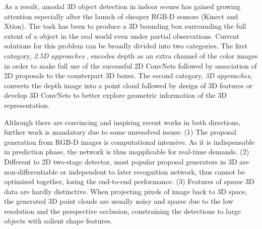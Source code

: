 \documentclass[10pt,twocolumn,letterpaper]{article}
\begin{document}
	As a result, amodal 3D object detection in indoor scenes has gained growing attention especially after the launch of cheaper RGB-D sensors (\eg Kinect and Xtion). The task has been to produce a 3D bounding box surrounding the full extent of a object in the real world even under partial observations. Current solutions for this problem can be broadly divided into two categories. The first category, \emph{2.5D approaches} \cite{K2013accurate, Wei2015DBM,Saurabh2015depthrcnn,Deng2017}, encodes depth as an extra channel of the color images in order to make full use of the successful 2D ConvNets followed by association of 2D proposals to the counterpart 3D boxes. The second category, \emph{3D approaches}, converts the depth image into a point cloud followed by design of 3D features\cite{Surans2014sliding, Zhile2016COG} or develop 3D ConvNets\cite{Suran2016DSS} to better explore geometric information of the 3D representation.\par
	Although there are convincing and inspiring recent works in both directions, further work is mandatory due to some unresolved issues: (1)  The proposal generation from RGB-D images is computational intensive. As it is indispensable in prediction phase, the network is thus inapplicable for real-time demands. (2) Different to 2D two-stage detector, most popular proposal generators in 3D are non-differentiable or independent to later recognition network, thus cannot be optimized together, losing the end-to-end performance. (3) Features of sparse 3D data are hardly distinctive. When projecting pixels of image back to 3D space, the generated 3D point clouds are usually noisy and sparse due to the low resolution and the perspective occlusion, constraining the detections to large objects with salient shape features.\par
	
\end{document}
